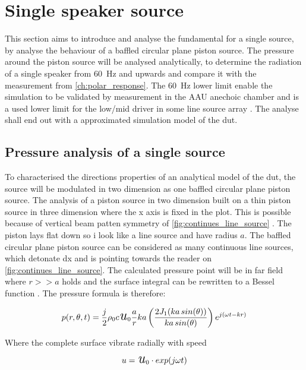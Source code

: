\section{Single speaker source}\label{ch:single_speaker_source}
This section aims to introduce and analyse the fundamental for a single source, by analyse the behaviour of a baffled circular plane piston source. The pressure around the piston source will be analysed analytically, to determine the radiation of a single speaker from \SI{60}{\hertz} and upwards and compare it with the measurement from \autoref{ch:polar_response}. The \SI{60}{\hertz} lower limit enable the simulation to be validated by measurement in the AAU anechoic chamber and is a used lower limit for the low/mid driver in some line source array \citep{V-DOSC}.  The analyse shall end out with a approximated simulation model of the \gls{dut}.

\subsection{Pressure analysis of a single source}
To characterised the directions properties of an analytical model of the \gls{dut}, the source will be modulated in two dimension as one baffled circular plane piston source. The analysis of a piston source in two dimension built on a thin piston source in three dimension where the x axis is fixed in the plot. This is possible because of vertical beam patten symmetry of \autoref{fig:continues_line_source} \citep{Kinsler2000}. The piston lays flat down so i look like a line source and have radius $a$. The baffled circular plane piston source can be considered as many continuous line sources, which detonate dx and is pointing towards the reader on \autoref{fig:continues_line_source}. The calculated pressure point will be in far field where $r>>a$ holds and the surface integral can be rewritten to a Bessel function \citep{Kinsler2000}. The pressure formula is therefore:

\begin{equation}
p(r,\theta ,t)=\frac{j}{2} \rho_{0}c  \text{\textit{{\LARGE u}}}_{0}\frac{a}{r}ka \left ( \frac{2J_1(ka\, sin(\theta ))}{ka\, sin(\theta )} \right )e^{j(\omega t-kr)}
\end{equation}


Where the complete surface vibrate radially with speed

\begin{equation}
u = \text{\textit{{\LARGE u}}}_{0} \cdot exp(j \omega t)
\end{equation}

